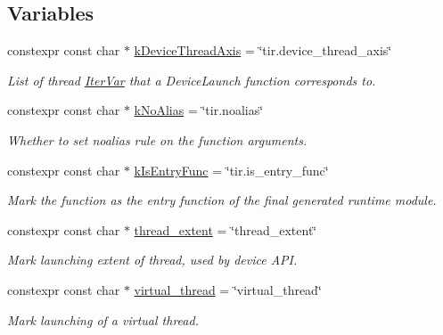 \subsection*{Variables}
\begin{DoxyCompactItemize}
\item 
constexpr const char $\ast$ \hyperlink{namespacetvm_1_1tir_1_1attr_a4933845b75cf4f08fb66f55fdd94986f}{k\+Device\+Thread\+Axis} = \char`\"{}tir.\+device\+\_\+thread\+\_\+axis\char`\"{}
\begin{DoxyCompactList}\small\item\em List of thread \hyperlink{classtvm_1_1tir_1_1IterVar}{Iter\+Var} that a Device\+Launch function corresponds to. \end{DoxyCompactList}\item 
constexpr const char $\ast$ \hyperlink{namespacetvm_1_1tir_1_1attr_ac74386674da85bc4b4dd1ee28a97ff63}{k\+No\+Alias} = \char`\"{}tir.\+noalias\char`\"{}
\begin{DoxyCompactList}\small\item\em Whether to set noalias rule on the function arguments. \end{DoxyCompactList}\item 
constexpr const char $\ast$ \hyperlink{namespacetvm_1_1tir_1_1attr_a489d0cebd2820025bc3d6c5a9011cdd4}{k\+Is\+Entry\+Func} = \char`\"{}tir.\+is\+\_\+entry\+\_\+func\char`\"{}
\begin{DoxyCompactList}\small\item\em Mark the function as the entry function of the final generated runtime module. \end{DoxyCompactList}\item 
constexpr const char $\ast$ \hyperlink{namespacetvm_1_1tir_1_1attr_a399eed804ecc482a607f0f65f07b78dd}{thread\+\_\+extent} = \char`\"{}thread\+\_\+extent\char`\"{}
\begin{DoxyCompactList}\small\item\em Mark launching extent of thread, used by device A\+PI. \end{DoxyCompactList}\item 
constexpr const char $\ast$ \hyperlink{namespacetvm_1_1tir_1_1attr_a464533c1560ace5e0b5071ba6902482e}{virtual\+\_\+thread} = \char`\"{}virtual\+\_\+thread\char`\"{}
\begin{DoxyCompactList}\small\item\em Mark launching of a virtual thread. \end{DoxyCompactList}\item 

\end{DoxyCompactItemize}
